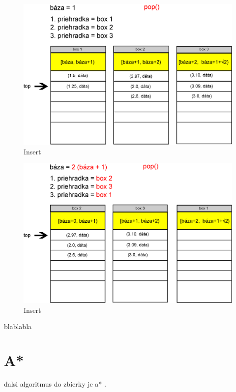 \begin{figure}[h]
\includegraphics[width=\textwidth]{./img/priehradky_naplnene_default_i_d1.eps}
\caption{Insert}
\label{fig:priehradky_i_d1}
\end{figure}

\begin{figure}[h]
\includegraphics[width=\textwidth]{./img/priehradky_naplnene_default_i_d2.eps}
\caption{Insert}
\label{fig:priehradky_i_d2}
\end{figure}

blablabla


\section{A*}
dalsi algoritmus do zbierky je a* \cite{astar72}.
